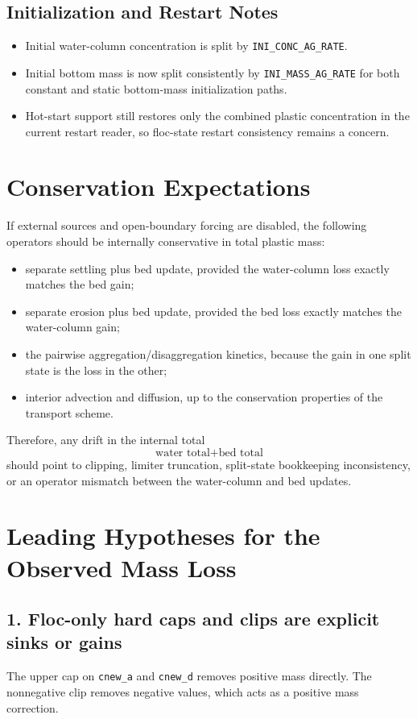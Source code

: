 \documentclass[11pt]{article}
\begin{document}
\subsection{Initialization and Restart Notes}
\begin{itemize}
\item Initial water-column concentration is split by \texttt{INI\_CONC\_AG\_RATE}.
\item Initial bottom mass is now split consistently by \texttt{INI\_MASS\_AG\_RATE} for both
constant and static bottom-mass initialization paths.
\item Hot-start support still restores only the combined plastic concentration in the current
restart reader, so floc-state restart consistency remains a concern.
\end{itemize}

\section{Conservation Expectations}
If external sources and open-boundary forcing are disabled, the following operators should be
internally conservative in total plastic mass:
\begin{itemize}
\item separate settling plus bed update, provided the water-column loss exactly matches the bed gain;
\item separate erosion plus bed update, provided the bed loss exactly matches the water-column gain;
\item the pairwise aggregation/disaggregation kinetics, because the gain in one split state is the
loss in the other;
\item interior advection and diffusion, up to the conservation properties of the transport scheme.
\end{itemize}

Therefore, any drift in the internal total
\[
\text{water total} + \text{bed total}
\]
should point to clipping, limiter truncation, split-state bookkeeping inconsistency, or an
operator mismatch between the water-column and bed updates.

\section{Leading Hypotheses for the Observed Mass Loss}
\subsection*{1. Floc-only hard caps and clips are explicit sinks or gains}
The upper cap on \texttt{cnew\_a} and \texttt{cnew\_d} removes positive mass directly. The
nonnegative clip removes negative values, which acts as a positive mass correction.
\end{document}
